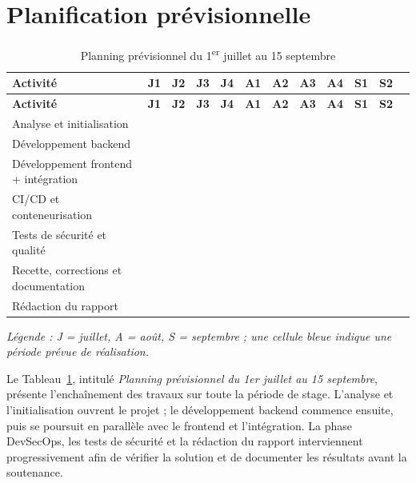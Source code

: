 \section{Planification prévisionnelle}
\begin{longtable}{p{5.2cm}ccccccccccc}
\caption{Planning prévisionnel du 1\textsuperscript{er} juillet au 15 septembre}\label{tab-planning}\\
\toprule
\textbf{Activité} & \textbf{J1} & \textbf{J2} & \textbf{J3} & \textbf{J4} & \textbf{A1} & \textbf{A2} & \textbf{A3} & \textbf{A4} & \textbf{S1} & \textbf{S2} \\
\midrule
\endfirsthead
\toprule
\textbf{Activité} & \textbf{J1} & \textbf{J2} & \textbf{J3} & \textbf{J4} & \textbf{A1} & \textbf{A2} & \textbf{A3} & \textbf{A4} & \textbf{S1} & \textbf{S2} \\
\midrule
\endhead
Analyse et initialisation & \cellcolor{ramblue} & \cellcolor{ramblue} & & & & & & & & \\
Développement backend & & \cellcolor{ramblue} & \cellcolor{ramblue} & \cellcolor{ramblue} & \cellcolor{ramblue} & & & & & \\
Développement frontend + intégration & & & \cellcolor{ramblue} & \cellcolor{ramblue} & \cellcolor{ramblue} & \cellcolor{ramblue} & & & & \\
CI/CD et conteneurisation & & & & & \cellcolor{ramblue} & \cellcolor{ramblue} & \cellcolor{ramblue} & & & \\
Tests de sécurité et qualité & & & & & & \cellcolor{ramblue} & \cellcolor{ramblue} & \cellcolor{ramblue} & & \\
Recette, corrections et documentation & & & & & & & & \cellcolor{ramblue} & \cellcolor{ramblue} & \cellcolor{ramblue} \\
Rédaction du rapport & & & & & & & & \cellcolor{ramblue} & \cellcolor{ramblue} & \cellcolor{ramblue} \\
\bottomrule
\end{longtable}
\textit{Légende : J = juillet, A = août, S = septembre ; une cellule bleue indique une période prévue de réalisation.}

Le Tableau~\ref{tab-planning}, intitulé \textit{Planning prévisionnel du 1er juillet au 15 septembre}, présente l'enchaînement des travaux sur toute la période de stage. L'analyse et l'initialisation ouvrent le projet ; le développement backend commence ensuite, puis se poursuit en parallèle avec le frontend et l'intégration. La phase DevSecOps, les tests de sécurité et la rédaction du rapport interviennent progressivement afin de vérifier la solution et de documenter les résultats avant la soutenance.

